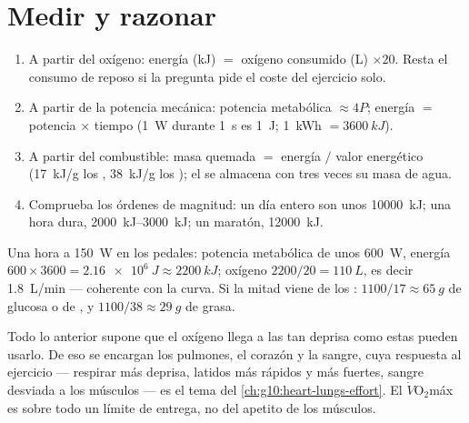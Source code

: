 \section{Medir y razonar}

\begin{method}\label{met:g10:exercise-and-energy:calc}
\begin{enumerate}
  \item A partir del oxígeno: energía (\unit{kJ}) $=$ oxígeno
        consumido (\unit{L}) $\times 20$. Resta el consumo de reposo si
        la pregunta pide el coste del ejercicio solo.
  \item A partir de la potencia mecánica: potencia metabólica
        $\approx 4 P$; energía $=$ potencia $\times$ tiempo
        (\qty{1}{W} durante \qty{1}{s} es \qty{1}{J}; \qty{1}{kWh} $= \qty{3600}{kJ}$).
  \item A partir del combustible: masa quemada $=$ energía $/$ valor
        energético (\qty{17}{kJ/g} los , \qty{38}{kJ/g} los
        ); el  se almacena con tres veces su masa de
        agua.
  \item Comprueba los órdenes de magnitud: un día entero son unos
        \qty{10000}{kJ}; una hora dura, \qtyrange{2000}{3000}{kJ}; un
        maratón, \qty{12000}{kJ}.
\end{enumerate}
\end{method}

\begin{example}\label{ex:g10:exercise-and-energy:hour}
Una hora a \qty{150}{W} en los pedales: potencia metabólica de unos
\qty{600}{W}, energía $600 \times 3600 = \qty{2.16e6}{J} \approx
\qty{2200}{kJ}$; oxígeno $2200/20 = \qty{110}{L}$, es decir
\qty{1.8}{L/min} --- coherente con la curva. Si la mitad viene de los
: $1100/17 \approx \qty{65}{g}$ de glucosa o de , y
$1100/38 \approx \qty{29}{g}$ de grasa.
\end{example}

\begin{remark}\label{rem:g10:exercise-and-energy:delivery}
Todo lo anterior supone que el oxígeno llega a las  tan
deprisa como estas pueden usarlo. De eso se encargan los pulmones, el
corazón y la sangre, cuya respuesta al ejercicio --- respirar más
deprisa, latidos más rápidos y más fuertes, sangre desviada a los
músculos --- es el tema del \cref{ch:g10:heart-lungs-effort}. El
$\dot V\!\mathrm{O_2}$máx es sobre todo un límite de entrega, no del
apetito de los músculos.
\end{remark}

